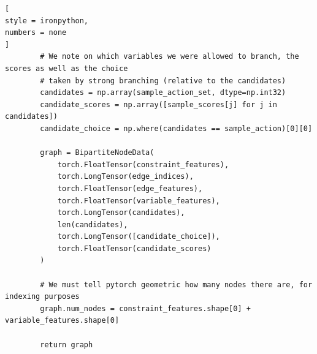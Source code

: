 \documentclass[%
	11pt,
	a4paper,
	utf8,
		]{article}
\begin{document}
\begin{lstlisting}[
style = ironpython,
numbers = none
]
		# We note on which variables we were allowed to branch, the scores as well as the choice
		# taken by strong branching (relative to the candidates)
		candidates = np.array(sample_action_set, dtype=np.int32)
		candidate_scores = np.array([sample_scores[j] for j in candidates])
		candidate_choice = np.where(candidates == sample_action)[0][0]

		graph = BipartiteNodeData(
			torch.FloatTensor(constraint_features),
			torch.LongTensor(edge_indices),
			torch.FloatTensor(edge_features),
			torch.FloatTensor(variable_features),
			torch.LongTensor(candidates),
			len(candidates),
			torch.LongTensor([candidate_choice]),
			torch.FloatTensor(candidate_scores)
		)

		# We must tell pytorch geometric how many nodes there are, for indexing purposes
		graph.num_nodes = constraint_features.shape[0] + variable_features.shape[0]

		return graph
\end{lstlisting}
\end{document}
